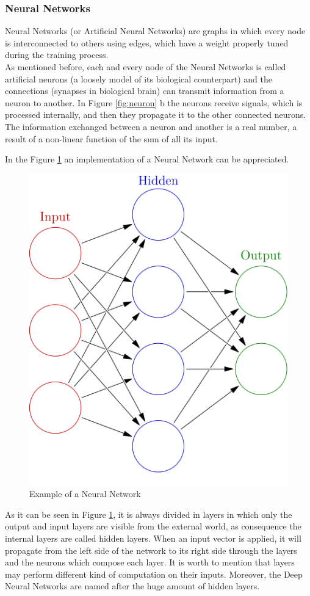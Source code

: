 \subsubsection{Neural Networks}

Neural Networks (or Artificial Neural Networks) are graphs in which every node is interconnected to others using edges, which have a weight properly tuned during the training process.\\
As mentioned before, each and every node of the Neural Networks is called artificial neurons (a loosely model of its biological counterpart) and the connections (synapses in biological brain) can transmit information from a neuron to another. In Figure \ref{fig:neuron} b the neurons receive signals, which is processed internally, and then they propagate it to the other connected neurons.\\
The information exchanged between a neuron and another is a real number, a result of a non-linear function of the sum of all its input.

In the Figure \ref{fig:nn} an implementation of a Neural Network can be appreciated.
\begin{figure}[H]
\centering
\captionsetup{justification=centering}
\includegraphics[scale=0.4]{./figure/neural_network.PNG}
\caption{Example of a Neural Network}
\label{fig:nn}
\end{figure}
As it can be seen in Figure \ref{fig:nn}, it is always divided in layers in which only the output and input layers are visible from the external world, as consequence the internal layers are called hidden layers. When an input vector is applied, it will propagate from the left side of the network to its right side through the layers and the neurons which compose each layer. It is worth to mention that layers may perform different kind of computation on their inputs. Moreover, the Deep Neural Networks are named after the huge amount of hidden layers.\\\\

